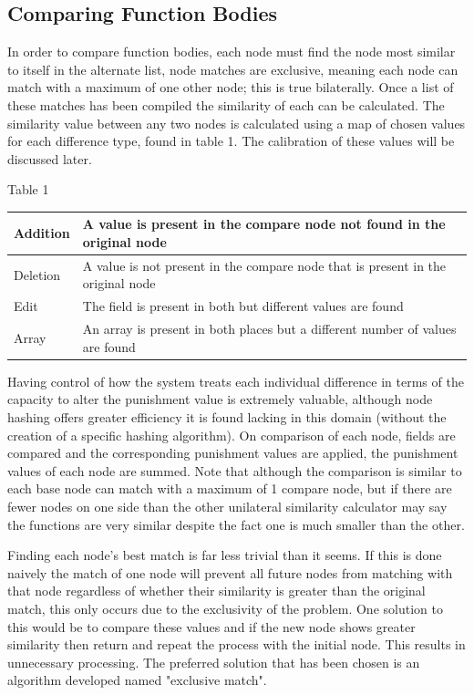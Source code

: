 \documentclass[jou,apacite]{apa6}
\begin{document}
\subsection{Comparing Function Bodies}
In order to compare function bodies, each node must find the node most similar to itself in the alternate list, node matches are exclusive, meaning each node can match with a maximum of one other node; this is true bilaterally. Once a list of these matches has been compiled the similarity of each can be calculated. The similarity value between any two nodes is calculated using a map of chosen values for each difference type, found in table 1.  The calibration of these values will be discussed later.

Table 1
\begin{tabular}{l|p{60mm}}
  \hline
  Addition & A value is present in the compare
    node not found in the original node\\
  \hline
  Deletion & A value is not present in the compare node that is present in the original node\\
  \hline
  Edit & The field is present in both but different values are found\\
  \hline
  Array & An array is present in both places but a different number of values are found\\
  \hline
\end{tabular}

Having control of how the system treats each individual difference in terms of the capacity to alter the punishment value is extremely valuable, although node hashing offers greater efficiency it is found lacking in this domain (without the creation of a specific hashing algorithm). On comparison of each node, fields are compared and the corresponding punishment values are applied, the punishment values of each node are summed. Note that although the comparison is similar to each base node can match with a maximum of 1 compare node, but if there are fewer nodes on one side than the other unilateral similarity calculator may say the functions are very similar despite the fact one is much smaller than the other. 

Finding each node’s best match is far less trivial than it seems. If this is done naively the match of one node will prevent all future nodes from matching with that node regardless of whether their similarity is greater than the original match, this only occurs due to the exclusivity of the problem. One solution to this would be to compare these values and if the new node shows greater similarity then return and repeat the process with the initial node. This results in unnecessary processing. The preferred solution that has been chosen is an algorithm developed named "exclusive match".
\end{document}

